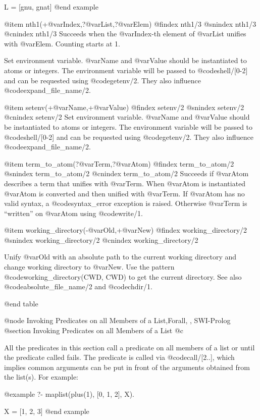 L = [gnu, gnat]
@end example

@item nth1(+@var{Index},?@var{List},?@var{Elem})
@findex nth1/3
@snindex nth1/3
@cnindex nth1/3
Succeeds when the @var{Index}-th element of @var{List} unifies with
@var{Elem}. Counting starts at 1.

Set environment variable.  @var{Name} and @var{Value} should be
instantiated to atoms or integers.  The environment variable will be
passed to @code{shell/[0-2]} and can be requested using @code{getenv/2}.
They also influence @code{expand_file_name/2}.

@item setenv(+@var{Name},+@var{Value})
@findex setenv/2
@snindex setenv/2
@cnindex setenv/2
Set environment variable.  @var{Name} and @var{Value} should be
instantiated to atoms or integers.  The environment variable will be
passed to @code{shell/[0-2]} and can be requested using @code{getenv/2}.
They also influence @code{expand_file_name/2}.

@item term_to_atom(?@var{Term},?@var{Atom})
@findex term_to_atom/2
@snindex term_to_atom/2
@cnindex term_to_atom/2
Succeeds if @var{Atom} describes a term that unifies with @var{Term}. When
@var{Atom} is instantiated @var{Atom} is converted and then unified with
@var{Term}.  If @var{Atom} has no valid syntax, a @code{syntax_error}
exception is raised. Otherwise @var{Term} is ``written'' on @var{Atom}
using @code{write/1}.

@item working_directory(-@var{Old},+@var{New})
@findex working_directory/2
@snindex working_directory/2
@cnindex working_directory/2

Unify @var{Old} with an absolute path to the current working directory
and change working directory to @var{New}.  Use the pattern
@code{working_directory(CWD, CWD)} to get the current directory.  See
also @code{absolute_file_name/2} and @code{chdir/1}.

@end table

@node Invoking Predicates on all Members of a List,Forall, , SWI-Prolog
@section Invoking Predicates on all Members of a List
@c \label{sec:applylist}

All the predicates in this section call a predicate on all members of a
list or until the predicate called fails.  The predicate is called via
@code{call/[2..]}, which implies common arguments can be put in
front of the arguments obtained from the list(s). For example:

@example
?- maplist(plus(1), [0, 1, 2], X).

X = [1, 2, 3]
@end example

